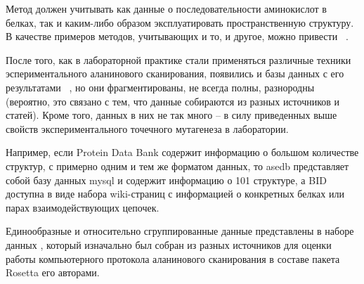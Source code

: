 Метод должен учитывать как данные о последовательности аминокислот в белках, так и каким-либо образом эксплуатировать пространственную структуру. В качестве примеров методов, учитывающих и то, и другое, можно привести ~\cite{hhm_svm}.



После того, как в лабораторной практике стали применяться различные техники эспериментального аланинового сканирования, появились и базы данных с его результатами ~\cite{asedb2001, bid2003}, но они фрагментированы, не всегда полны, разнородны (вероятно, это связано с тем, что данные собираются из разных источников и статей). Кроме того, данных в них не так много -- в силу приведенных выше свойств экспериментального точечного мутагенеза в лаборатории.

Например, если Protein Data Bank содержит информацию о большом количестве структур, с примерно одним и тем же форматом данных, то asedb представляет собой базу данных mysql и содержит информацию о 101 структуре, а BID доступна в виде набора wiki-страниц с информацией о конкретных белках или парах взаимодействующих цепочек.

Единообразные и относительно сгруппированные данные представлены в наборе данных  \cite{kortemme_alascan_datasets}, который изначально был собран из разных источников для оценки работы компьютерного протокола аланинового сканирования в составе пакета Rosetta \cite{kortemme2002, kortemme2004} его авторами.  